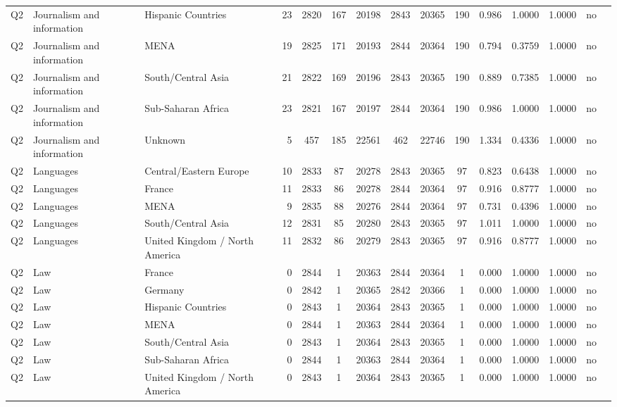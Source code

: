 \begin{longtable}{lllrcccccccccll}
Q2 & Journalism and information & Hispanic Countries & 23 & 2820 & 167 & 20198 & 2843 & 20365 & 190 & 0.986 & 1.0000 & 1.0000 & no \\
Q2 & Journalism and information & MENA & 19 & 2825 & 171 & 20193 & 2844 & 20364 & 190 & 0.794 & 0.3759 & 1.0000 & no \\
Q2 & Journalism and information & South/Central Asia & 21 & 2822 & 169 & 20196 & 2843 & 20365 & 190 & 0.889 & 0.7385 & 1.0000 & no \\
Q2 & Journalism and information & Sub-Saharan Africa & 23 & 2821 & 167 & 20197 & 2844 & 20364 & 190 & 0.986 & 1.0000 & 1.0000 & no \\
Q2 & Journalism and information & Unknown & 5 & 457 & 185 & 22561 & 462 & 22746 & 190 & 1.334 & 0.4336 & 1.0000 & no \\
Q2 & Languages & Central/Eastern Europe & 10 & 2833 & 87 & 20278 & 2843 & 20365 & 97 & 0.823 & 0.6438 & 1.0000 & no \\
Q2 & Languages & France & 11 & 2833 & 86 & 20278 & 2844 & 20364 & 97 & 0.916 & 0.8777 & 1.0000 & no \\
Q2 & Languages & MENA & 9 & 2835 & 88 & 20276 & 2844 & 20364 & 97 & 0.731 & 0.4396 & 1.0000 & no \\
Q2 & Languages & South/Central Asia & 12 & 2831 & 85 & 20280 & 2843 & 20365 & 97 & 1.011 & 1.0000 & 1.0000 & no \\
Q2 & Languages & United Kingdom / North America & 11 & 2832 & 86 & 20279 & 2843 & 20365 & 97 & 0.916 & 0.8777 & 1.0000 & no \\
Q2 & Law & France & 0 & 2844 & 1 & 20363 & 2844 & 20364 & 1 & 0.000 & 1.0000 & 1.0000 & no \\
Q2 & Law & Germany & 0 & 2842 & 1 & 20365 & 2842 & 20366 & 1 & 0.000 & 1.0000 & 1.0000 & no \\
Q2 & Law & Hispanic Countries & 0 & 2843 & 1 & 20364 & 2843 & 20365 & 1 & 0.000 & 1.0000 & 1.0000 & no \\
Q2 & Law & MENA & 0 & 2844 & 1 & 20363 & 2844 & 20364 & 1 & 0.000 & 1.0000 & 1.0000 & no \\
Q2 & Law & South/Central Asia & 0 & 2843 & 1 & 20364 & 2843 & 20365 & 1 & 0.000 & 1.0000 & 1.0000 & no \\
Q2 & Law & Sub-Saharan Africa & 0 & 2844 & 1 & 20363 & 2844 & 20364 & 1 & 0.000 & 1.0000 & 1.0000 & no \\
Q2 & Law & United Kingdom / North America & 0 & 2843 & 1 & 20364 & 2843 & 20365 & 1 & 0.000 & 1.0000 & 1.0000 & no \\

\end{longtable}
